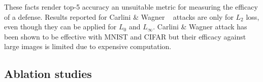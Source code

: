 These facts render top-5 accuracy an unsuitable metric for measuring the efficacy of a defense.
Results reported for Carlini \& Wagner ~\cite{Carlini2017TowardsET} attacks are only for $L_2$ loss, even though they can be applied for $L_0$ and $L_\infty$. 
Carlini \& Wagner attack has been shown to be effective with MNIST and CIFAR but their efficacy against large images is limited due to expensive computation. 




\subsection{Ablation studies}

